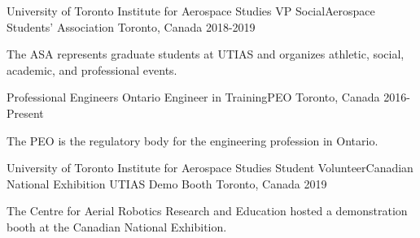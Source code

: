 

\begin{cventries} 

  \cventry
    {University of Toronto Institute for Aerospace Studies} %
    {VP Social{\enskip\cdotp\enskip}Aerospace Students' Association} %
    {Toronto, Canada} %
    {2018-2019} %
    {
      \begin{cvitems} %
        \item {The ASA represents graduate students at UTIAS and organizes athletic, social, academic, and professional events.}
      \end{cvitems}
    }
    
  \cventry
    {Professional Engineers Ontario} %
    {Engineer in Training{\enskip\cdotp\enskip}PEO} %
    {Toronto, Canada} %
    {2016-Present} %
    {
      \begin{cvitems} %
        \item {The PEO is the regulatory body for the engineering profession in Ontario.}
      \end{cvitems}
    }
    
  \cventry
    {University of Toronto Institute for Aerospace Studies} %
    {Student Volunteer{\enskip\cdotp\enskip}Canadian National Exhibition UTIAS Demo Booth} %
    {Toronto, Canada} %
    {2019} %
    {
      \begin{cvitems} %
        \item {The Centre for Aerial Robotics Research and Education hosted a demonstration booth at the Canadian National Exhibition.}
       \end{cvitems}
    }

\end{cventries}
